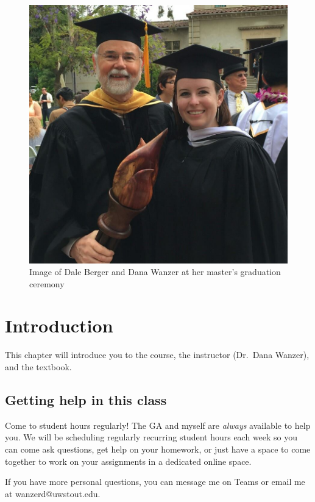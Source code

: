 \documentclass[
]{book}
\begin{document}
\begin{figure}
\centering
\includegraphics{images/Dale.jpg}
\caption{Image of Dale Berger and Dana Wanzer at her master's graduation ceremony}
\end{figure}

\hypertarget{introduction}{%
\chapter{Introduction}\label{introduction}}

This chapter will introduce you to the course, the instructor (Dr.~Dana Wanzer), and the textbook.

\hypertarget{getting-help-in-this-class}{%
\section{Getting help in this class}\label{getting-help-in-this-class}}

Come to student hours regularly! The GA and myself are \emph{always} available to help you. We will be scheduling regularly recurring student hours each week so you can come ask questions, get help on your homework, or just have a space to come together to work on your assignments in a dedicated online space.

If you have more personal questions, you can message me on Teams or email me at wanzerd@uwstout.edu.
\end{document}
